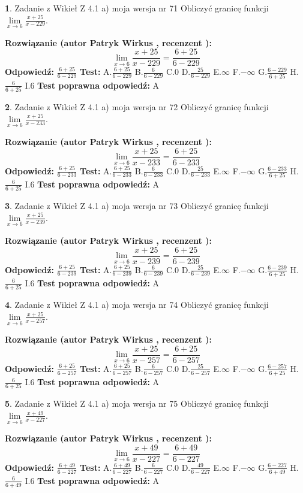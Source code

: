 \documentclass[12pt, a4paper]{article}
\theoremstyle{definition} %
\newtheorem{zad}{}
\newcommand{\zadStart}[1]{\begin{zad}#1\newline}
\newcommand{\zadStop}{\end{zad}}
\newcommand{\rozwStart}[2]{\noindent \textbf{Rozwiązanie (autor #1 , recenzent #2): }\newline}
\newcommand{\rozwStop}{\newline}
\newcommand{\odpStart}{\noindent \textbf{Odpowiedź:}\newline}
\newcommand{\odpStop}{\newline}
\newcommand{\testStart}{\noindent \textbf{Test:}\newline}
\newcommand{\testStop}{\newline}
\newcommand{\kluczStart}{\noindent \textbf{Test poprawna odpowiedź:}\newline}
\newcommand{\kluczStop}{\newline}
\begin{document}
\zadStart{Zadanie z Wikieł Z 4.1 a) moja wersja nr 71}
Obliczyć granicę funkcji $\lim\limits_{x\to6}\frac{x+25}{x-229}$.
\zadStop
\rozwStart{Patryk Wirkus}{}
$$\lim\limits_{x\to6}\frac{x+25}{x-229} = \frac{6+25}{6-229}$$
\rozwStop
\odpStart
$\frac{6+25}{6-229}$
\odpStop
\testStart
A.$\frac{6+25}{6-229}$
B.$\frac{6}{6-229}$
C.$0$
D.$\frac{25}{6-229}$
E.$\infty$
F.$-\infty$
G.$\frac{6-229}{6+25}$
H.$\frac{6}{6+25}$
I.$6$
\testStop
\kluczStart
A
\kluczStop



\zadStart{Zadanie z Wikieł Z 4.1 a) moja wersja nr 72}
Obliczyć granicę funkcji $\lim\limits_{x\to6}\frac{x+25}{x-233}$.
\zadStop
\rozwStart{Patryk Wirkus}{}
$$\lim\limits_{x\to6}\frac{x+25}{x-233} = \frac{6+25}{6-233}$$
\rozwStop
\odpStart
$\frac{6+25}{6-233}$
\odpStop
\testStart
A.$\frac{6+25}{6-233}$
B.$\frac{6}{6-233}$
C.$0$
D.$\frac{25}{6-233}$
E.$\infty$
F.$-\infty$
G.$\frac{6-233}{6+25}$
H.$\frac{6}{6+25}$
I.$6$
\testStop
\kluczStart
A
\kluczStop



\zadStart{Zadanie z Wikieł Z 4.1 a) moja wersja nr 73}
Obliczyć granicę funkcji $\lim\limits_{x\to6}\frac{x+25}{x-239}$.
\zadStop
\rozwStart{Patryk Wirkus}{}
$$\lim\limits_{x\to6}\frac{x+25}{x-239} = \frac{6+25}{6-239}$$
\rozwStop
\odpStart
$\frac{6+25}{6-239}$
\odpStop
\testStart
A.$\frac{6+25}{6-239}$
B.$\frac{6}{6-239}$
C.$0$
D.$\frac{25}{6-239}$
E.$\infty$
F.$-\infty$
G.$\frac{6-239}{6+25}$
H.$\frac{6}{6+25}$
I.$6$
\testStop
\kluczStart
A
\kluczStop



\zadStart{Zadanie z Wikieł Z 4.1 a) moja wersja nr 74}
Obliczyć granicę funkcji $\lim\limits_{x\to6}\frac{x+25}{x-257}$.
\zadStop
\rozwStart{Patryk Wirkus}{}
$$\lim\limits_{x\to6}\frac{x+25}{x-257} = \frac{6+25}{6-257}$$
\rozwStop
\odpStart
$\frac{6+25}{6-257}$
\odpStop
\testStart
A.$\frac{6+25}{6-257}$
B.$\frac{6}{6-257}$
C.$0$
D.$\frac{25}{6-257}$
E.$\infty$
F.$-\infty$
G.$\frac{6-257}{6+25}$
H.$\frac{6}{6+25}$
I.$6$
\testStop
\kluczStart
A
\kluczStop



\zadStart{Zadanie z Wikieł Z 4.1 a) moja wersja nr 75}
Obliczyć granicę funkcji $\lim\limits_{x\to6}\frac{x+49}{x-227}$.
\zadStop
\rozwStart{Patryk Wirkus}{}
$$\lim\limits_{x\to6}\frac{x+49}{x-227} = \frac{6+49}{6-227}$$
\rozwStop
\odpStart
$\frac{6+49}{6-227}$
\odpStop
\testStart
A.$\frac{6+49}{6-227}$
B.$\frac{6}{6-227}$
C.$0$
D.$\frac{49}{6-227}$
E.$\infty$
F.$-\infty$
G.$\frac{6-227}{6+49}$
H.$\frac{6}{6+49}$
I.$6$
\testStop
\kluczStart
A
\kluczStop
\end{document}
